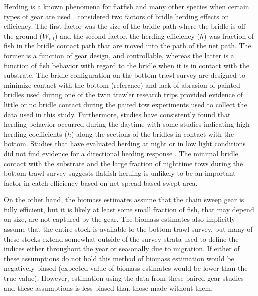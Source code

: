\documentclass[
  12pt,
]{article}
\begin{document}
Herding is a known phenomena for flatfish and many other species when
certain types of gear are used
\citep{rammxiao95,somertonmunro01,somertonetal07,roseetal10}.
\citet{somertonmunro01} considered two factors of bridle herding effects
on efficiency. The first factor was the size of the bridle path where
the bridle is off the ground (\(W_\text{off}\)) and the second factor,
the herding efficiency (\(h\)) was fraction of fish in the bridle
contact path that are moved into the path of the net path. The former is
a function of gear design, and controllable, whereas the latter is a
function of fish behavior with regard to the bridle when it is in
contact with the substrate. The bridle configuration on the bottom trawl
survey are designed to minimize contact with the bottom (reference) and
lack of abrasion of painted bridles used during one of the twin trawler
research trips provided evidence of little or no bridle contact during
the paired tow experiments used to collect the data used in this study.
Furthermore, studies have consistently found that herding behavior
occurred during the daytime
\citep{glasswardle89,somertonmunro01,ryerbarnett06,bryanetal14,ryeretal10,deanetal21}
with some studies indicating high herding coefficients (\(h\)) along the
sections of the bridles in contact with the bottom. Studies that have
evaluated herding at night or in low light conditions did not find
evidence for a directional herding response
\citep{glasswardle89,ryerbarnett06,ryer08,ryeretal10}. The minimal
bridle contact with the substrate and the large fraction of nighttime
tows during the bottom trawl survey suggests flatfish herding is
unlikely to be an important factor in catch efficiency based on net
spread-based swept area.

On the other hand, the biomass estimates assume that the chain sweep
gear is fully efficient, but it is likely at least some small fraction
of fish, that may depend on size, are not captured by the gear. The
biomass estimates also implicitly assume that the entire stock is
available to the bottom trawl survey, but many of these stocks extend
somewhat outside of the survey strata used to define the indices either
throughout the year or seasonally due to migration. If either of these
assumptions do not hold this method of biomass estimation would be
negatively biased (expected value of biomass estimates would be lower
than the true value). However, estimation using the data from these
paired-gear studies and these assumptions is less biased than those made
without them.
\end{document}
